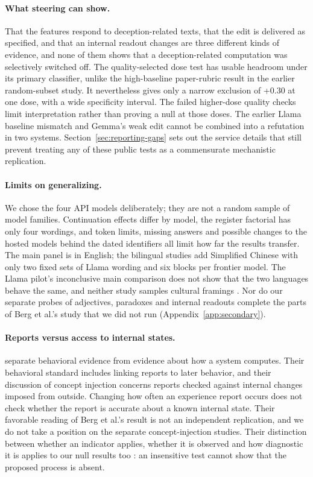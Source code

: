 \documentclass[11pt]{article}
\begin{document}
\paragraph{What steering can show.}
That the features respond to deception-related texts, that the edit is
delivered as specified, and that an internal readout changes are three
different kinds of evidence, and none of them shows that a deception-related
computation was selectively switched off. The quality-selected dose test
has usable headroom under its primary classifier, unlike the high-baseline
paper-rubric result in the earlier random-subset study. It nevertheless
gives only a narrow exclusion of +0.30 at one dose, with a wide specificity
interval. The failed higher-dose quality checks limit interpretation rather
than proving a null at those doses. The earlier Llama baseline mismatch and
Gemma's weak edit cannot be combined into a refutation in two systems.
Section~\ref{sec:reporting-gaps} sets out the service details that still
prevent treating any of these public tests as a commensurate mechanistic
replication.

\paragraph{Limits on generalizing.}
We chose the four API models deliberately; they are not a random sample of
model families. Continuation effects differ by model, the register factorial
has only four wordings, and token limits, missing answers and possible changes
to the hosted models behind the dated identifiers all limit how far the
results transfer. The main panel is in English; the bilingual studies add
Simplified Chinese with only two fixed sets of Llama wording and six blocks
per frontier model. The Llama pilot's inconclusive main comparison does not
show that the two languages behave the same, and neither study samples
cultural framings \citep{havaldar2023multilingual,dudy2024analyzing}. Nor do
our separate probes of adjectives, paradoxes and internal readouts complete
the parts of Berg et al.'s study that we did not run
(Appendix~\ref{app:secondary}).

\paragraph{Reports versus access to internal states.}
\citet[Secs.~5.1--5.2 and 9.8]{chandaria2026cacophony} separate behavioral
evidence from evidence about how a system computes. Their behavioral standard
includes linking reports to later behavior, and their discussion of concept
injection concerns reports checked against internal changes imposed from
outside. Changing how often an experience report occurs does not check
whether the report is accurate about a known internal state. Their favorable
reading of Berg et al.'s result is not an independent replication, and we do
not take a position on the separate concept-injection studies. Their
distinction between whether an indicator applies, whether it is observed and
how diagnostic it is applies to our null results too
\citep[Sec.~7.1]{chandaria2026cacophony}: an insensitive test cannot show
that the proposed process is absent.
\end{document}
